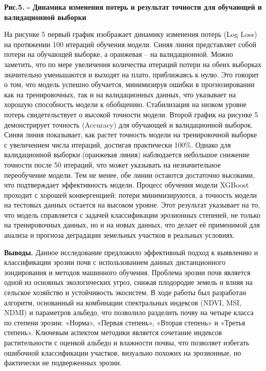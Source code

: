 {\bfseries Рис.5. - Динамика изменения потерь и результат точности для
обучающей и валидационной выборки}

На рисунке 5 первый график изображает динамику изменения потерь (Log
Loss) на протяжении 100 итераций обучения модели. Синяя линия
представляет собой потери на обучающей выборке, а оранжевая -- на
валидационной. Можно заметить, что по мере увеличения количества
итераций потери на обеих выборках значительно уменьшаются и выходят на
плато, приближаясь к нулю. Это говорит о том, что модель успешно
обучается, минимизируя ошибки в прогнозировании как на тренировочных,
так и на валидационных данных, что указывает на хорошую способность
модели к обобщению. Стабилизация на низком уровне потерь свидетельствует
о высокой точности модели. Второй график на рисунке 5 демонстрирует
точность (Accuracy) для обучающей и валидационной выборок. Синяя линия
показывает, как растет точность модели на тренировочной выборке с
увеличением числа итераций, достигая практически 100\%. Однако для
валидационной выборки (оранжевая линия) наблюдается небольшое снижение
точности после 50 итераций, что может указывать на незначительное
переобучение модели. Тем не менее, обе линии остаются достаточно
высокими, что подтверждает эффективность модели. Процесс обучения модели
XGBoost проходит с хорошей конвергенцией: потери минимизируются, а
точность модели на тестовых данных остается на высоком уровне. Этот
результат указывает на то, что модель справляется с задачей
классификации эрозионных степеней, не только на тренировочных данных, но
и на новых данных, что делает её применимой для анализа и прогноза
деградации земельных участков в реальных условиях.

{\bfseries Выводы.} Данное исследование предложило эффективный подход к
выявлению и классификации эрозии почв с использованием данных
дистанционного зондирования и методов машинного обучения. Проблема
эрозии почв является одной из основных экологических угроз, снижая
плодородие земель и влияя на сельское хозяйство и устойчивость
экосистем. В ходе работы был разработан алгоритм, основанный на
комбинации спектральных индексов (NDVI, MSI, NDMI) и параметров альбедо,
что позволило разделить почву на четыре класса по степени эрозии:
«Норма», «Первая степень», «Вторая степень» и «Третья степень». Ключевым
аспектом методики является сочетание индексов растительности с оценкой
альбедо и влажности почвы, что позволяет избегать ошибочной
классификации участков, визуально похожих на эрозионные, но фактически
не подверженных эрозии.

